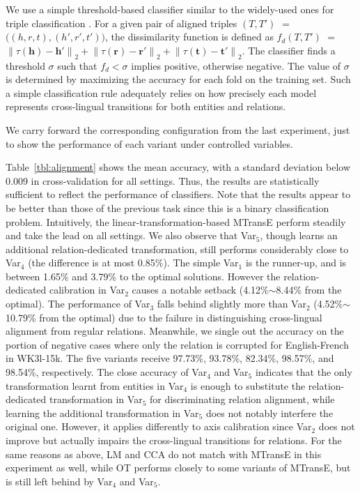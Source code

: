 \documentclass{article}
\begin{document}
We use a simple threshold-based classifier similar to the widely-used ones for triple classification \cite{socher2013reasoning,wang2014knowledge,lin2015learning}. For a given pair of aligned triples $(T, T')$ $=$ $\bigl((h, r, t), (h', r', t')\bigr)$, the dissimilarity function is defined as $f_d(T, T')$ $=$ $\left \| \tau (\mathbf{h})-\mathbf{h}'\right \|_2+\left \| \tau (\mathbf{r})-\mathbf{r}'\right \|_2+\left \| \tau (\mathbf{t})-\mathbf{t}'\right \|_2$. The classifier finds a threshold $\sigma$ such that $f_d<\sigma$ implies positive, otherwise negative. The value of $\sigma$ is determined by maximizing the accuracy for each fold on the training set. Such a simple classification rule adequately relies on how precisely each model represents cross-lingual transitions for both entities and relations.

We carry forward the corresponding configuration from the last experiment, just to show the performance of each variant under controlled variables.

 Table~\ref{tbl:alignment} shows the mean accuracy, with a \mbox{standard} deviation below 0.009 in cross-validation for all settings. Thus,
the results are statistically sufficient to reflect the performance of classifiers. Note that the results appear to be better than those of the previous task since this is a binary classification problem. Intuitively, the linear-transformation-based MTransE perform steadily and take the lead on all settings. We also observe that Var$_5$, though learns an additional relation-dedicated transformation, still performs considerably close to Var$_4$ (the difference is at most 0.85\%). The simple Var$_1$ is the runner-up, and is between 1.65\% and 3.79\% to the optimal solutions. However the relation-dedicated calibration in Var$_2$ causes a notable setback (4.12\%${\sim}$8.44\% from the optimal). The performance of Var$_3$ falls behind slightly more than Var$_2$ (4.52\%${\sim}$10.79\% from the optimal) due to the failure in distinguishing cross-lingual alignment from regular relations. Meanwhile, we single out the accuracy on the portion of negative cases where only the relation is corrupted for English-French in WK3l-15k. The five variants receive 97.73\%, 93.78\%, 82.34\%, 98.57\%, and 98.54\%, respectively. The close accuracy of Var$_4$ and Var$_5$ indicates that the only transformation learnt from entities in Var$_4$ is \mbox{enough} to substitute the relation-dedicated transformation in Var$_5$ for discriminating relation \mbox{alignment}, while learning the additional transformation in Var$_5$ does not notably interfere the original one. However, it applies differently to axis calibration since Var$_2$ does not improve but actually impairs the cross-lingual transitions for relations. For the same reasons as above, LM and CCA do not match with MTransE in this experiment as well, while OT performs closely to some variants of MTransE, but is still left behind by Var$_4$ and Var$_5$.
\par
\end{document}
